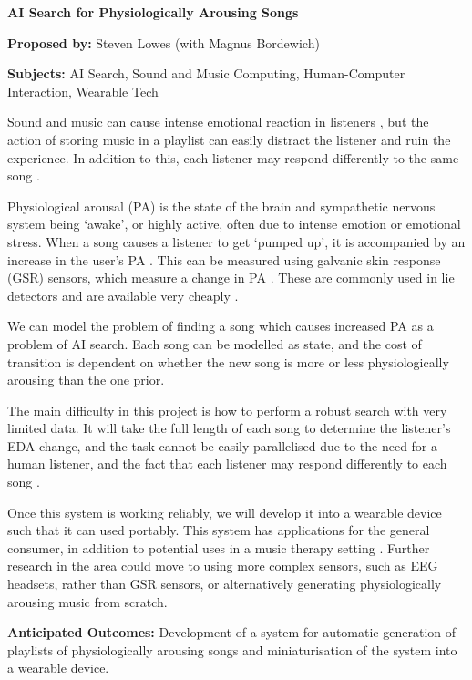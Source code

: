 \documentclass[a4paper,12pt]{article}
\begin{document}
	\begin{center}
		\Huge \textbf{AI Search for Physiologically Arousing Songs}
	\end{center}

	\textbf{Proposed by:} Steven Lowes (with Magnus Bordewich)
	
	\textbf{Subjects:} AI Search, Sound and Music Computing, Human-Computer Interaction, Wearable Tech

	Sound and music can cause intense emotional reaction in listeners \citep{arousingMusic}, but the action of storing music in a playlist can easily distract the listener and ruin the experience. In addition to this, each listener may respond differently to the same song \citep{musicDifferences}.
	
	Physiological arousal (PA) is the state of the brain and sympathetic nervous system being `awake', or highly active, often due to intense emotion or emotional stress. When a song causes a listener to get `pumped up', it is accompanied by an increase in the user's PA \citep{pumpedUp}. This can be measured using galvanic skin response (GSR) sensors, which measure a change in PA \citep{GSR}. These are commonly used in lie detectors and are available very cheaply \citep{gsrSensor}.
	
	We can model the problem of finding a song which causes increased PA as a problem of AI search. Each song can be modelled as state, and the cost of transition is dependent on whether the new song is more or less physiologically arousing than the one prior.
	
	The main difficulty in this project is how to perform a robust search with very limited data. It will take the full length of each song to determine the listener's EDA change, and the task cannot be easily parallelised due to the need for a human listener, and the fact that each listener may respond differently to each song \citep{musicDifferences}.
	
	Once this system is working reliably, we will develop it into a wearable device such that it can used portably. This system has applications for the general consumer, in addition to potential uses in a music therapy setting \citep{musicTherapy}. Further research in the area could move to using more complex sensors, such as EEG headsets, rather than GSR sensors, or alternatively generating physiologically arousing music from scratch.
	
	\textbf{Anticipated Outcomes:} Development of a system for automatic generation of playlists of physiologically arousing songs and miniaturisation of the system into a wearable device.
	
	
\end{document}
